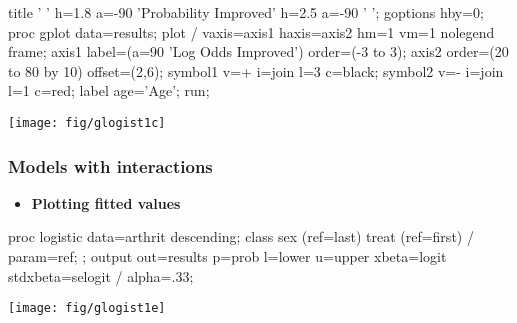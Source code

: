 \begin{frame}[fragile]

\begin{Input}[fontsize=\footnotesize,label=\fbox{$\cdots$ \texttt{glogist1c.sas}},baselinestretch=0.7,firstnumber=30]
title ' '
   h=1.8 a=-90 'Probability Improved'    
   h=2.5 a=-90 ' ';                      
goptions hby=0;                          
proc gplot data=results;
   plot  / 
         vaxis=axis1 haxis=axis2 hm=1 vm=1
         nolegend  frame;
   axis1 label=(a=90 'Log Odds Improved')
         order=(-3 to 3);
   axis2 order=(20 to 80 by 10) offset=(2,6);
   symbol1 v=+ i=join l=3 c=black;
   symbol2 v=- i=join l=1 c=red;
   label age='Age';
run;
\end{Input}
 \begin{center}
  \texttt{[image: fig/glogist1c]}
 \end{center}
\end{frame}

\begin{frame}[fragile]
  \frametitle{Models with interactions}
  \begin{itemize}
	\item{\large\bfseries Plotting fitted values}
  \end{itemize}
\begin{Input}[baselinestretch=0.8,fontsize=\footnotesize]
proc logistic data=arthrit descending;
   class sex (ref=last) treat (ref=first) / param=ref;
   ;
   output out=results p=prob l=lower u=upper
          xbeta=logit stdxbeta=selogit / alpha=.33;
\end{Input}

 \begin{center}
  \texttt{[image: fig/glogist1e]}
 \end{center}
\end{frame}

\endinput
\begin{frame}
  \frametitle{}
  \begin{itemize}
	\item{\large\bfseries }
      \begin{itemize*}
	  \item 
    	\begin{itemize*}
		\item 
		\item 
		\end{itemize*}
	  \item 
	  \end{itemize*}
	\item{\large\bfseries }
	\item{\large\bfseries }
  \end{itemize}
\end{frame}

